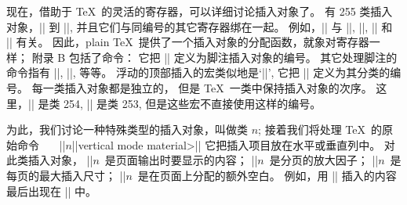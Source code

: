 \ddanger 现在，借助于 \TeX\ 的灵活的寄存器，可以详细讨论插入对象了。%
有 255 类插入对象，|| 到 ||,
并且它们与同编号的其它寄存器绑在一起。%
例如，|| 与 ||, ||, || 和 || 有关。%
因此，plain \TeX\ 提供了一个插入对象的分配函数，就象对寄存器一样；
附录 B 包括了命令：
\begintt
\newinsert\footins
\endtt
它把 |\footins| 定义为脚注插入对象的编号。%
其它处理脚注的命令指有 |\count\footins|, |\dimen\footins|, 等等。%
浮动的顶部插入的宏类似地是`|\newinsert\topins|', 它把 |\topins| 定义为其分类的编号。%
每一类插入对象都是独立的，
但是 \TeX\ 一类中保持插入对象的次序。%
这里，|\footins| 是类 254, |\topins| 是类 253,
但是这些宏不直接使用这样的编号。

\def\n{\thinspace$n$}
\ddanger 为此，我们讨论一种特殊类型的插入对象，叫做类 $n$;
接着我们将处理 \TeX\ 的原始命令
\begindisplay
\ \ \ |\insert|\n|{|\<vertical mode material>|}|
\enddisplay
它把插入项目放在水平或垂直列中。%
对此类插入对象，
\begindisplay
|\box|\n\ 是页面输出时要显示的内容；\cr
|\count|\n\ 是分页的放大因子；\cr
|\dimen|\n\ 是每页的最大插入尺寸；\cr
|\skip|\n\ 是在页面上分配的额外空白。\cr
\enddisplay
例如，用 || 插入的内容最后出现在 || 中。

